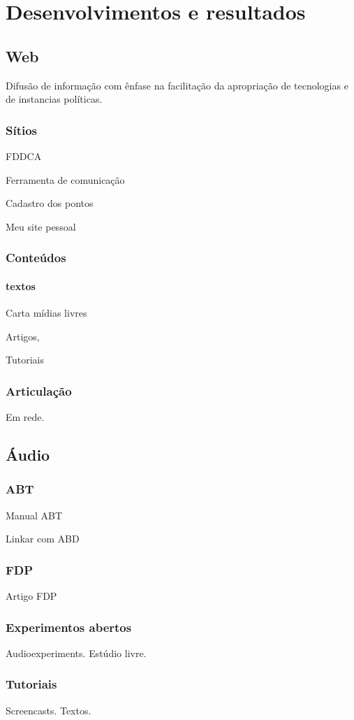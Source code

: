 \chapter{Desenvolvimentos e resultados} %
\label{cap:intro} %

\section{Web}

Difusão de informação com ênfase na facilitação
da apropriação de tecnologias e de instancias políticas.

\subsection{Sítios}

FDDCA

Ferramenta de comunicação

Cadastro dos pontos

Meu site pessoal

\subsection{Conteúdos}

\subsubsection{textos}
Carta mídias livres

Artigos,

Tutoriais

\subsection{Articulação}

Em rede.


\section{Áudio}

\subsection{ABT}

Manual ABT

Linkar com ABD

\subsection{FDP}

Artigo FDP

\subsection{Experimentos abertos}

Audioexperiments. Estúdio livre.

\subsection{Tutoriais}

Screencasts. Textos.